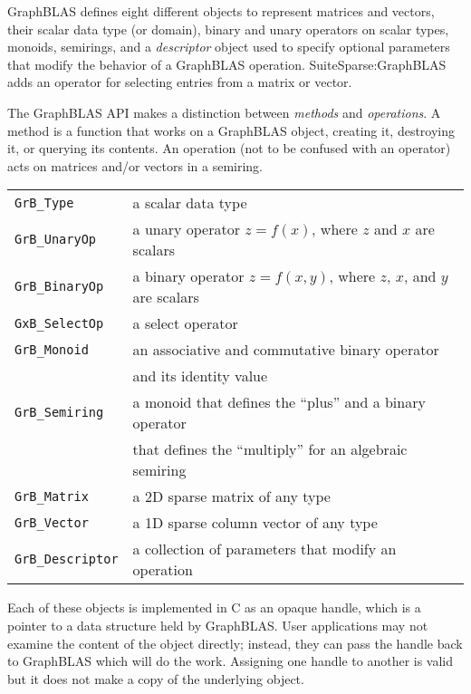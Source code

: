 \documentclass[12pt]{article}
\begin{document}
GraphBLAS defines eight different objects to represent matrices and vectors,
their scalar data type (or domain), binary and unary operators on scalar types,
monoids, semirings, and a {\em descriptor} object used to specify optional
parameters that modify the behavior of a GraphBLAS operation.
SuiteSparse:GraphBLAS adds an operator for selecting entries from a matrix or
vector.

The GraphBLAS API makes a distinction between {\em methods} and {\em
operations}.  A method is a function that works on a GraphBLAS object, creating
it, destroying it, or querying its contents.  An operation (not to be confused
with an operator) acts on matrices and/or vectors in a semiring.

\vspace{0.1in}
\noindent
{\small
\begin{tabular}{ll}
\hline
\verb'GrB_Type'     & a scalar data type \\
\verb'GrB_UnaryOp'  & a unary operator $z=f(x)$,
                        where $z$ and $x$ are scalars\\
\verb'GrB_BinaryOp' & a binary operator $z=f(x,y)$,
                        where $z$, $x$, and $y$ are scalars\\
\verb'GxB_SelectOp' & a select operator \\
\verb'GrB_Monoid'   & an associative and commutative binary operator  \\
                    & and its identity value \\
\verb'GrB_Semiring' & a monoid that defines the ``plus'' and a binary operator\\
                    & that defines the ``multiply'' for an algebraic semiring \\
\verb'GrB_Matrix'   & a 2D sparse matrix of any type \\
\verb'GrB_Vector'   & a 1D sparse column vector of any type \\
\verb'GrB_Descriptor'& a collection of parameters that modify an operation \\
\hline
\end{tabular}
}
\vspace{0.1in}

Each of these objects is implemented in C as an opaque handle, which is a
pointer to a data structure held by GraphBLAS.  User applications may not
examine the content of the object directly; instead, they can pass the handle
back to GraphBLAS which will do the work.  Assigning one handle to another
is valid but it does not make a copy of the underlying object.
\end{document}
